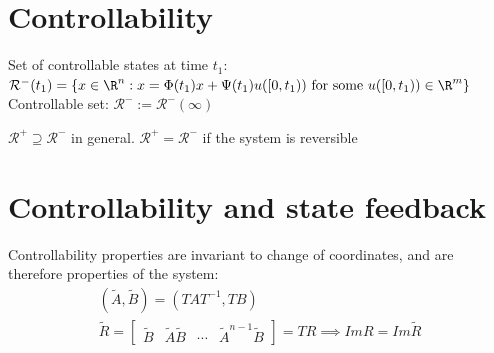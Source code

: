 \documentclass[english]{lectures}
\begin{document}
\section{Controllability}

\begin{definition}[Controllability]
    Set of controllable states  at time $t_1$: \(\mathcal{R}^-(t_1)=\{x\in \R^n : x = \Phi(t_1)x+\Psi(t_1)u([0,t_1)) \text{ for some }u([0,t_1)) \in \R^m\}\)\\
    Controllable set: \(\mathcal{R}^-:=\mathcal{R}^-(\infty)\)
\end{definition}

\begin{theorem}
    \( \mathcal{R}^+ \supseteq \mathcal{R}^- \) in general. \(\mathcal{R}^+ = \mathcal{R}^-\) if the system is reversible
\end{theorem}

\section{Controllability and state feedback}
Controllability properties are invariant to change of coordinates, and are therefore properties of the system:\\
\begin{gather*}
    (\tilde{A}, \tilde{B})=(TAT^{-1},TB)\\
    \tilde{R}=\begin{bmatrix}
        \tilde{B} & \tilde{A}\tilde{B} & \cdots & \tilde{A}^{n-1}\tilde{B}
    \end{bmatrix}=TR \implies ImR=Im\tilde{R}
\end{gather*}
\end{document}
